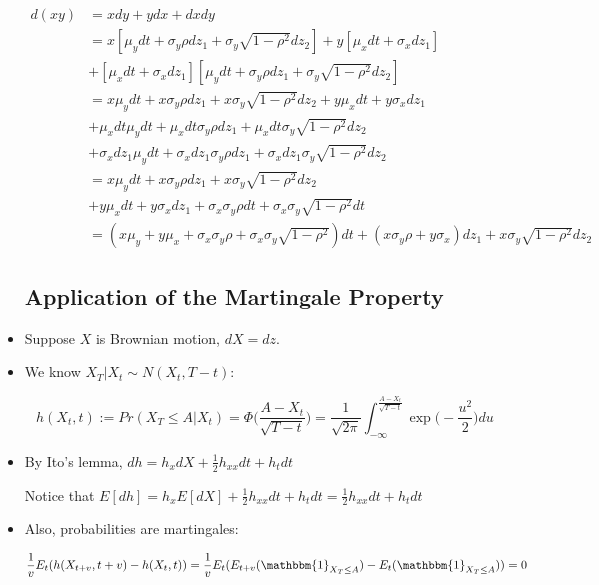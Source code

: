 \documentclass{article}
\newcommand{\onebf}{\mathbbm{1}}
\begin{document}
\begin{itemize}
\begin{align*}
d(xy) 
&= xdy + ydx + dxdy\\
&= x[\mu_y dt + \sigma_y \rho dz_1 + \sigma_y \sqrt{1 - \rho^2} dz_2] + y[\mu_x dt + \sigma_x dz_1] \\
&+ [\mu_x dt + \sigma_x dz_1][\mu_y dt + \sigma_y \rho dz_1 + \sigma_y \sqrt{1 - \rho^2} dz_2]\\
&= x\mu_y dt + x\sigma_y \rho dz_1 + x\sigma_y \sqrt{1 - \rho^2} dz_2 + y\mu_x dt + y\sigma_x dz_1 \\
&+ \mu_x dt\mu_y dt + \mu_x dt\sigma_y \rho dz_1 + \mu_x dt\sigma_y \sqrt{1 - \rho^2} dz_2\\
&+\sigma_x dz_1\mu_y dt + \sigma_x dz_1\sigma_y \rho dz_1 + \sigma_x dz_1\sigma_y \sqrt{1 - \rho^2} dz_2\\
&= x\mu_y dt + x\sigma_y \rho dz_1 + x\sigma_y \sqrt{1 - \rho^2} dz_2 \\
&+ y\mu_x dt + y\sigma_x dz_1 + \sigma_x \sigma_y \rho dt + \sigma_x \sigma_y \sqrt{1 - \rho^2} dt\\
&= (x \mu_y + y \mu_x + \sigma_x \sigma_y \rho+ \sigma_x \sigma_y \sqrt{1-\rho^2}) dt + (x \sigma_y \rho + y \sigma_x)dz_1 + x \sigma_y \sqrt{1 - \rho^2} dz_2
\end{align*}

\subsection*{Application of the Martingale Property}

\item Suppose $X$ is Brownian motion, $dX = dz$.

\item We know $X_T | X_t \sim N(X_t, T - t)$:

$$
h(X_t, t) 
:= Pr(X_T \le A | X_t) 
= \Phi\Bigg(\frac{A - X_t}{\sqrt{T-t}}\Bigg) 
= \frac{1}{\sqrt{2\pi}} \int_{-\infty}^{\frac{A - X_t}{\sqrt{T - t}}} \exp \Bigg(- \frac{u^2}{2}\Bigg) du
$$

\item By Ito's lemma, $dh = h_x dX + \frac{1}{2} h_{xx} dt + h_t dt$ 

Notice that $E[dh] = h_x E[dX] + \frac{1}{2} h_{xx} dt + h_t dt = \frac{1}{2} h_{xx} dt + h_t dt$

\item Also, probabilities are martingales:

$$
\frac{1}{v} E_t(h(X_{t+v}, t+v) - h(X_t, t)) = \frac{1}{v} E_t(E_{t+v}(\onebf_{X_T \le A}) - E_{t}(\onebf_{X_T \le A})) = 0
$$


\end{itemize}
\end{document}
